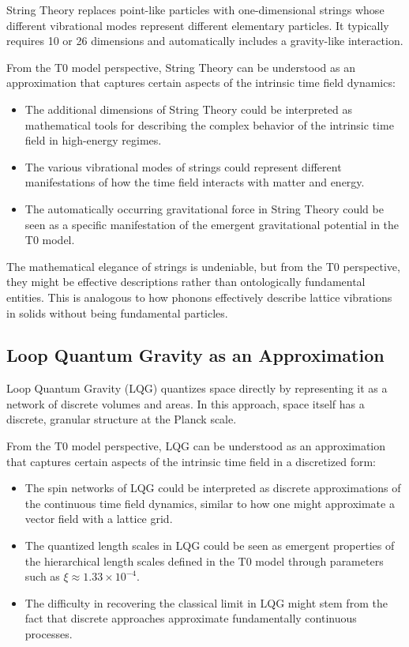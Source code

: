 \documentclass[12pt,a4paper]{article}
\begin{document}
	String Theory replaces point-like particles with one-dimensional strings whose different vibrational modes represent different elementary particles. It typically requires 10 or 26 dimensions and automatically includes a gravity-like interaction.
	
	From the T0 model perspective, String Theory can be understood as an approximation that captures certain aspects of the intrinsic time field dynamics:
	
	\begin{itemize}
		\item The additional dimensions of String Theory could be interpreted as mathematical tools for describing the complex behavior of the intrinsic time field in high-energy regimes.
		
		\item The various vibrational modes of strings could represent different manifestations of how the time field interacts with matter and energy.
		
		\item The automatically occurring gravitational force in String Theory could be seen as a specific manifestation of the emergent gravitational potential in the T0 model.
	\end{itemize}
	
	The mathematical elegance of strings is undeniable, but from the T0 perspective, they might be effective descriptions rather than ontologically fundamental entities. This is analogous to how phonons effectively describe lattice vibrations in solids without being fundamental particles.
	
	\subsection{Loop Quantum Gravity as an Approximation}
	\label{subsec:lqg}
	
	Loop Quantum Gravity (LQG) quantizes space directly by representing it as a network of discrete volumes and areas. In this approach, space itself has a discrete, granular structure at the Planck scale.
	
	From the T0 model perspective, LQG can be understood as an approximation that captures certain aspects of the intrinsic time field in a discretized form:
	
	\begin{itemize}
		\item The spin networks of LQG could be interpreted as discrete approximations of the continuous time field dynamics, similar to how one might approximate a vector field with a lattice grid.
		
		\item The quantized length scales in LQG could be seen as emergent properties of the hierarchical length scales defined in the T0 model through parameters such as $\xi \approx 1.33 \times 10^{-4}$.
		
		\item The difficulty in recovering the classical limit in LQG might stem from the fact that discrete approaches approximate fundamentally continuous processes.
	\end{itemize}
	
\end{document}
